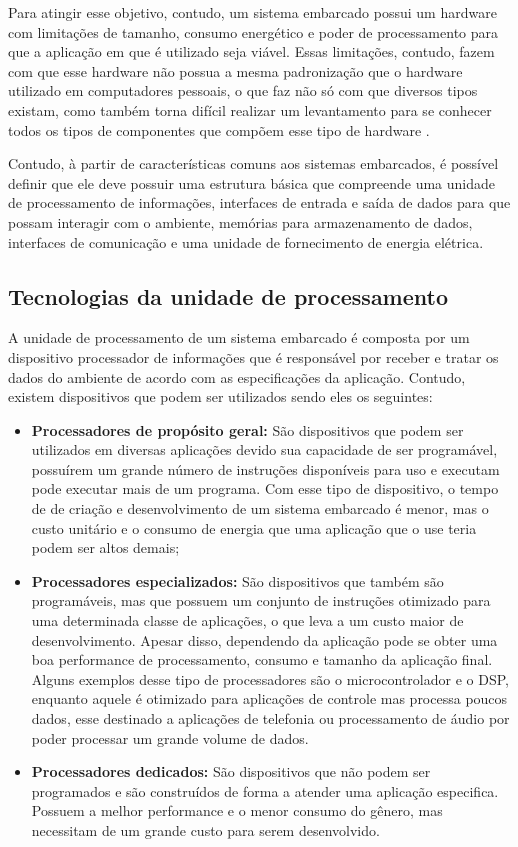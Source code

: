 Para atingir esse objetivo, contudo, um sistema embarcado possui um hardware com limitações de tamanho, consumo energético e poder de processamento para que a aplicação em que é utilizado seja viável. Essas limitações, contudo, fazem com que esse hardware  não possua a mesma padronização que o hardware utilizado em computadores pessoais, o que faz não só com que diversos tipos existam, como também torna difícil realizar um levantamento para se conhecer todos os tipos de componentes que compõem esse tipo de hardware \cite{marwedel2021embedded}. 

Contudo, à partir de características comuns aos sistemas embarcados, é possível definir que ele deve possuir uma estrutura básica que compreende uma unidade de processamento de informações, interfaces de entrada e saída de dados para que possam interagir com o ambiente, memórias para armazenamento de dados, interfaces de comunicação e uma unidade de fornecimento de energia elétrica. 


\subsection{Tecnologias da unidade de processamento}


A unidade de processamento de um sistema embarcado é composta por um dispositivo processador de informações que é responsável por receber e tratar os dados do ambiente de acordo com as especificações da aplicação. Contudo, existem dispositivos que podem ser utilizados sendo eles os seguintes:


\begin{itemize}
    \item \textbf{Processadores de propósito geral: } São dispositivos que podem ser utilizados em diversas aplicações devido sua capacidade de ser programável, possuírem um grande número de instruções disponíveis para  uso e executam pode executar mais de um programa. Com esse tipo de dispositivo, o tempo de de criação e desenvolvimento de um sistema embarcado é menor, mas o custo unitário e o consumo de energia que uma aplicação que o use teria podem ser altos demais;
    
    \item \textbf{Processadores especializados: } São dispositivos que também são programáveis, mas que possuem um conjunto de instruções otimizado para uma determinada classe de aplicações, o que leva a um custo maior de desenvolvimento. Apesar disso,  dependendo da aplicação pode se obter uma boa performance de processamento, consumo e tamanho da aplicação final. Alguns exemplos desse tipo de processadores são o microcontrolador e o \gls{DSP}, enquanto aquele é otimizado para aplicações de controle mas processa poucos dados, esse destinado a aplicações de telefonia ou processamento de áudio por poder processar um grande volume de dados.
    
    
    \item \textbf{Processadores dedicados: } São dispositivos que não podem ser programados e são construídos de forma a atender uma aplicação especifica. Possuem a melhor performance e o menor consumo do gênero, mas necessitam de um grande custo para serem desenvolvido.
\end{itemize}

